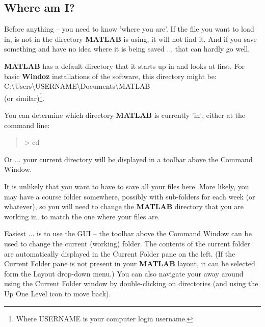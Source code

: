 \documentclass{tufte-book} %
\newenvironment{docspec}{\begin{quotation}\ttfamily\parskip0pt\parindent0pt\ignorespaces}{\end{quotation}}
\begin{document}

\subsection{Where am I?}

Before anything -- you need to know 'where you are'. If the file you want to load in, is not in the directory \textbf{MATLAB} is using, it will not find it. And if you save something and have no idea where it is being saved ... that can hardly go well.

\textbf{MATLAB} has a default directory that it starts up in and looks at first. For basic \textbf{Windoz} installations of the software, this directory might be:
\vspace{1mm}
\\\textsf{C:\textbackslash Users\textbackslash USERNAME\textbackslash Documents\textbackslash MATLAB}
\vspace{1mm}
\\(or similar)\footnote{Where \textsf{\footnotesize USERNAME} is your computer login username.}.

You can determine which directory \textbf{MATLAB} is currently 'in', either at the command line:
\begin{docspec}
> cd
\end{docspec}

Or ... your current directory will be displayed in a toolbar above the \textsf{Command Window}. 

It is unlikely that you want to have to save all your files here. More likely, you may have a course folder somewhere, possibly with sub-folders for each week (or whatever), so you will need to change the \textbf{MATLAB} directory that you are working in, to match the one where your files are. 

Easiest ... is to use the GUI -- the toolbar above the \textsf{Command Window} can be used to change the current (working) folder. The contents of the current folder are automatically displayed in the \textsf{Current Folder} pane on the left. (If the \textsf{Current Folder} pane is not present in your \textbf{MATLAB} layout, it can be selected form the \textsf{Layout} drop-down menu.) You can also navigate your away around using the \textsf{Current Folder} window by double-clicking on directories (and using the \textsf{Up One Level} icon to move back).
\end{document}
